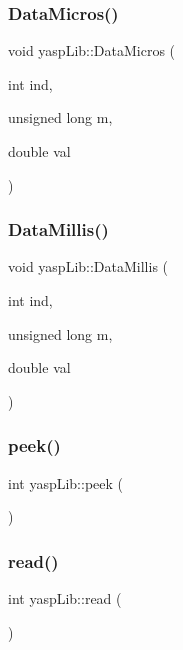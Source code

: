 \subsubsection{\texorpdfstring{DataMicros()}{DataMicros()}}
{\footnotesize\ttfamily void yasp\+Lib\+::\+Data\+Micros (\begin{DoxyParamCaption}\item[{int}]{ind,  }\item[{unsigned long}]{m,  }\item[{double}]{val }\end{DoxyParamCaption})}

\mbox{\label{classyasp_lib_a6b16e66f55632fa5c28dc70a07ff831c}} 
\subsubsection{\texorpdfstring{DataMillis()}{DataMillis()}}
{\footnotesize\ttfamily void yasp\+Lib\+::\+Data\+Millis (\begin{DoxyParamCaption}\item[{int}]{ind,  }\item[{unsigned long}]{m,  }\item[{double}]{val }\end{DoxyParamCaption})}

\mbox{\label{classyasp_lib_a91694d687c8c92726bceaeb71dbbb744}} 
\subsubsection{\texorpdfstring{peek()}{peek()}}
{\footnotesize\ttfamily int yasp\+Lib\+::peek (\begin{DoxyParamCaption}{ }\end{DoxyParamCaption})\hspace{0.3cm}{\ttfamily [private]}}

\mbox{\label{classyasp_lib_a9336c4c9856879c5cff7d631d1e283bc}} 
\subsubsection{\texorpdfstring{read()}{read()}}
{\footnotesize\ttfamily int yasp\+Lib\+::read (\begin{DoxyParamCaption}{ }\end{DoxyParamCaption})\hspace{0.3cm}{\ttfamily [private]}}

